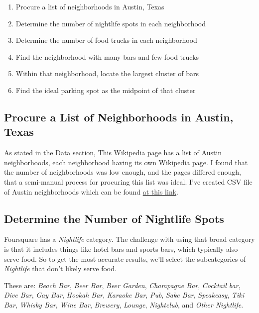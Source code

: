 \documentclass{deagle}
\begin{document}
\begin{enumerate}
	\item Procure a list of neighborhoods in Austin, Texas
	\item Determine the number of nightlife spots in each neighborhood
	\item Determine the number of food trucks in each neighborhood
	\item Find the neighborhood with many bars and few food trucks
	\item Within that neighborhood, locate the largest cluster of bars
	\item Find the ideal parking spot as the midpoint of that cluster
\end{enumerate}

\subsection*{Procure a List of Neighborhoods in Austin, Texas}

As stated in the Data section, \href{https://en.wikipedia.org/wiki/Category:Neighborhoods_in_Austin,_Texas}{This Wikipedia page} has a list of Austin neighborhoods, each neighborhood having its own Wikipedia page. I found that the number of neighborhoods was low enough, and the pages differed enough, that a semi-manual process for procuring this list was ideal. I've created CSV file of Austin neighborhoods which can be found \href{https://github.com/bryandeagle/Coursera_Capstone/raw/main/austin.csv}{at this link}.

\subsection*{Determine the Number of Nightlife Spots}

Foursquare has a \emph{Nightlife} category. The challenge with using that broad category is that it includes things like hotel bars and sports bars, which typically also serve food. So to get the most accurate results, we'll select the subcategories of \emph{Nightlife} that don't likely serve food.

These are: \emph{Beach Bar}, \emph{Beer Bar}, \emph{Beer Garden}, \emph{Champagne Bar}, \emph{Cocktail bar}, \emph{Dive Bar}, \emph{Gay Bar}, \emph{Hookah Bar}, \emph{Karaoke Bar}, \emph{Pub}, \emph{Sake Bar}, \emph{Speakeasy}, \emph{Tiki Bar}, \emph{Whisky Bar}, \emph{Wine Bar}, \emph{Brewery}, \emph{Lounge}, \emph{Nightclub}, and \emph{Other Nightlife}.
\end{document}
